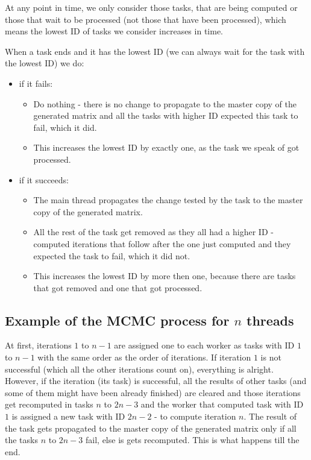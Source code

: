 At any point in time, we only consider those tasks, that are being computed or those that wait to be processed (not those that have been processed), which means the lowest ID of tasks we consider increases in time.

When a task ends and it has the lowest ID (we can always wait for the task with the lowest ID) we do:
\begin{itemize}
\item if it fails:
\begin{itemize}
\item Do nothing - there is no change to propagate to the master copy of the generated matrix and all the tasks with higher ID expected this task to fail, which it did.
\item This increases the lowest ID by exactly one, as the task we speak of got processed.
\end{itemize}
\item if it succeeds: 
\begin{itemize}
\item The main thread propagates the change tested by the task to the master copy of the generated matrix.
\item All the rest of the task get removed as they all had a higher ID - computed iterations that follow after the one just computed and they expected the task to fail, which it did not.
\item This increases the lowest ID by more then one, because there are tasks that got removed and one that got processed.
\end{itemize}
\end{itemize}

\subsection{Example of the MCMC process for $n$ threads}
At first, iterations $1$ to $n-1$ are assigned one to each worker as tasks with ID $1$ to $n-1$ with the same order as the order of iterations. If iteration $1$ is not successful (which all the other iterations count on), everything is alright. However, if the iteration (its task) is successful, all the results of other tasks (and some of them might have been already finished) are cleared and those iterations get recomputed in tasks $n$ to $2n-3$ and the worker that computed task with ID $1$ is assigned a new task with ID $2n-2$ - to compute iteration $n$. The result of the task gets propagated to the master copy of the generated matrix only if all the tasks $n$ to $2n-3$ fail, else is gets recomputed. This is what happens till the end.

